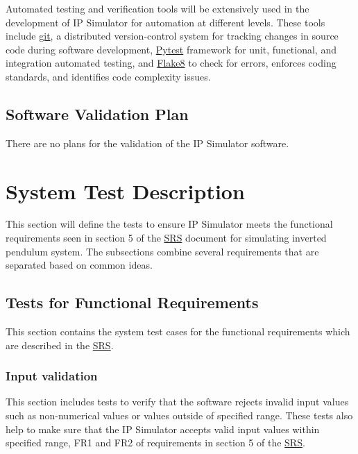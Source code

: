 \documentclass[12pt, titlepage]{article}
\begin{document}
Automated testing and verification tools will be extensively used in the development of IP Simulator for automation at different levels. These tools include \href{https://github.com/MinMah23/CAS741-Project}{git}, a distributed version-control system for tracking changes in source code during software development, \href{https://docs.pytest.org/en/7.2.x/}{Pytest} framework for unit, functional, and integration automated testing, and \href{https://flake8.pycqa.org/en/latest/}{Flake8} to check for errors, enforces coding standards, and identifies code complexity issues.

\subsection{Software Validation Plan}

There are no plans for the validation of the IP Simulator software.

\section{System Test Description}\label{test}
This section will define the tests to ensure IP Simulator meets the functional requirements seen in section 5 of the \href{https://github.com/MinMah23/CAS741-Project/tree/main/docs/SRS/SRS.pdf}{SRS} document for simulating inverted pendulum system. The subsections combine several requirements that are separated based on common ideas.

\subsection{Tests for Functional Requirements}
This section contains the system test cases for the functional requirements which are described in the  \href{https://github.com/MinMah23/CAS741-Project/tree/main/docs/SRS/SRS.pdf}{SRS}.

\subsubsection{Input validation \label{inp_val}}
This section includes tests to verify that the software rejects invalid input values such as non-numerical values or values outside of specified range. These tests also help to make sure that the IP Simulator accepts valid input values within specified range, FR1 and FR2 of requirements in section 5 of the  \href{https://github.com/MinMah23/CAS741-Project/tree/main/docs/SRS/SRS.pdf}{SRS}.
\end{document}
